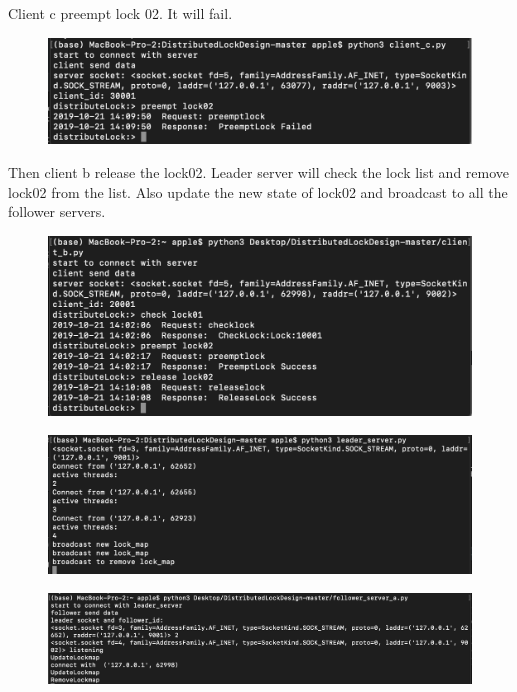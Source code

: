 \documentclass[10pt]{article}
\begin{document}
Client c preempt lock 02. It will fail.
\begin{figure}[H]
\centerline{\includegraphics[width = 1\textwidth]{screenshot//client_08.png}}
\end{figure}

Then client b release the lock02. Leader server will check the lock list and remove lock02 from the list. Also update the new state of lock02 and broadcast to all the follower servers.
\begin{figure}[H]
\centerline{\includegraphics[width = 1\textwidth]{screenshot//client_09.png}}
\end{figure}

\begin{figure}[H]
\centerline{\includegraphics[width = 1\textwidth]{screenshot//leader_05.png}}
\end{figure}

\begin{figure}[H]
\centerline{\includegraphics[width = 1\textwidth]{screenshot//follower_a_05.png}}
\end{figure}
\end{document}
